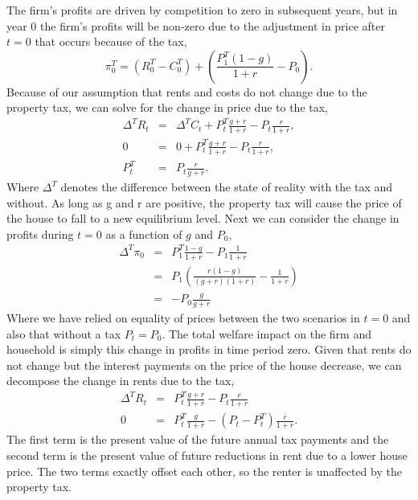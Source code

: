 \documentclass[ecta,nameyear,draft]{econsocart}
\theoremstyle{plain}
\theoremstyle{remark}
\begin{document}
The firm's profits are driven by competition to zero in subsequent years, but in year 0 the firm's profits will be non-zero due to the adjustment in price after $t=0$ that occurs because of the tax,
\begin{equation*}
	\pi^T_0 = (R^T_0-C^T_0)+\left(\frac{P^T_{1}(1-g)}{1+r}-P_0\right).\label{piT0}
\end{equation*}
Because of our assumption that rents and costs do not change due to the property tax, we can solve for the change in price due to the tax,
\begin{eqnarray}
	\Delta^T R_t&=&\Delta^T C_t+P^T_{t}\frac{g+r}{1+r}-P_{t} \frac{r}{1+r},\nonumber \\
	0&=&0+P^T_{t}\frac{g+r}{1+r}-P_{t} \frac{r}{1+r},\nonumber \\
	P^T_t&=& P_t\frac{r}{g+r}.\label{TxPrice} \label{Ptax}
\end{eqnarray}
Where $\Delta^T$ denotes the difference between the state of reality with the tax and without. As long as g and r are positive, the property tax will cause the price of the house to fall to a new equilibrium level.
Next we can consider the change in profits during $t=0$ as a function of $g$ and $P_0$,
\begin{eqnarray*}
	\Delta^T \pi_0 &=& P_1^T\frac{1-g}{1+r}-P_1\frac{1}{1+r}\\
	&=& P_1\left(\frac{r(1-g)}{(g+r)(1+r)}-\frac{1}{1+r}\right)\\
	&=&-P_0\frac{g}{g+r}
\end{eqnarray*}
Where we have relied on equality of prices between the two scenarios in $t=0$ and also that without a tax $P_t=P_0$. The total welfare impact on the firm and household is simply this change in profits in time period zero.
Given that rents do not change but the interest payments on the price of the house decrease, we can decompose the change in rents due to the tax,
\begin{eqnarray*}
	\Delta^T R_t&=&P^T_t\frac{g+r}{1+r}-P_t\frac{r}{1+r}\\
	0&=&P^T_t\frac{g}{1+r}-(P_t-P_t^T)\frac{r}{1+r}.
\end{eqnarray*}
The first term is the present value of the future annual tax payments and the second term is the present value of future reductions in rent due to a lower house price. The two terms exactly offset each other, so the renter is unaffected by the property tax.
\end{document}
